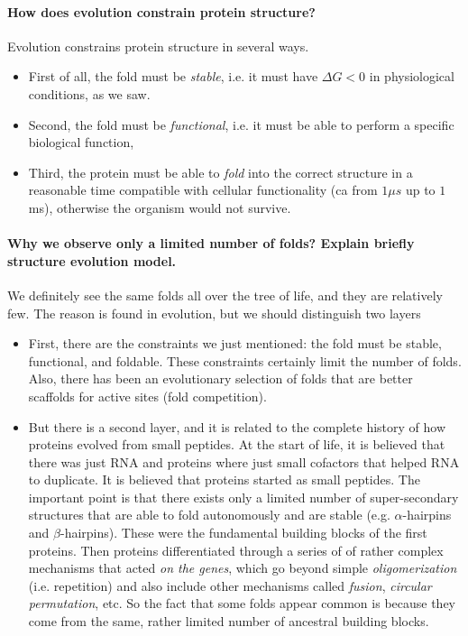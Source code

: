 \paragraph{How does evolution constrain protein structure?}
Evolution constrains protein structure in several ways. 
\begin{itemize}
\item First of all, the fold must be \textit{stable}, i.e. it must have $\Delta G < 0$ in physiological conditions, as we saw.
\item Second, the fold must be \textit{functional}, i.e. it must be able to perform a specific biological function,
\item Third, the protein must be able to \textit{fold} into the correct structure in a reasonable time compatible with cellular functionality (ca from $1\mu s$ up to $1$ ms), otherwise the organism would not survive.
\end{itemize}


\paragraph{Why we observe only a limited number of folds? Explain briefly structure evolution model.}
We definitely see the same folds all over the tree of life, and they are relatively few. The reason is found in evolution, but we should distinguish two layers
\begin{itemize}
\item First, there are the constraints we just mentioned: the fold must be stable, functional, and foldable. These constraints certainly limit the number of folds. Also, there has been an evolutionary selection of folds that are better scaffolds for active sites (fold competition).
\item But there is a second layer, and it is related to the complete history of how proteins evolved from small peptides. At the start of life, it is believed that there was just RNA and proteins where just small cofactors that helped RNA to duplicate.
It is believed that proteins started as small peptides. The important point is that there exists only a limited number of super-secondary structures that are able to fold autonomously and are stable (e.g. $\alpha$-hairpins and $\beta$-hairpins). These were the fundamental building blocks of the first proteins. Then proteins differentiated
through a series of of rather complex mechanisms that acted \textit{on the genes}, which go beyond simple \textit{oligomerization} (i.e. repetition) and also include other mechanisms called \textit{fusion}, \textit{circular permutation}, etc. So the fact that some folds appear common is because they come from the same, rather limited number of ancestral building blocks. 
\end{itemize}

